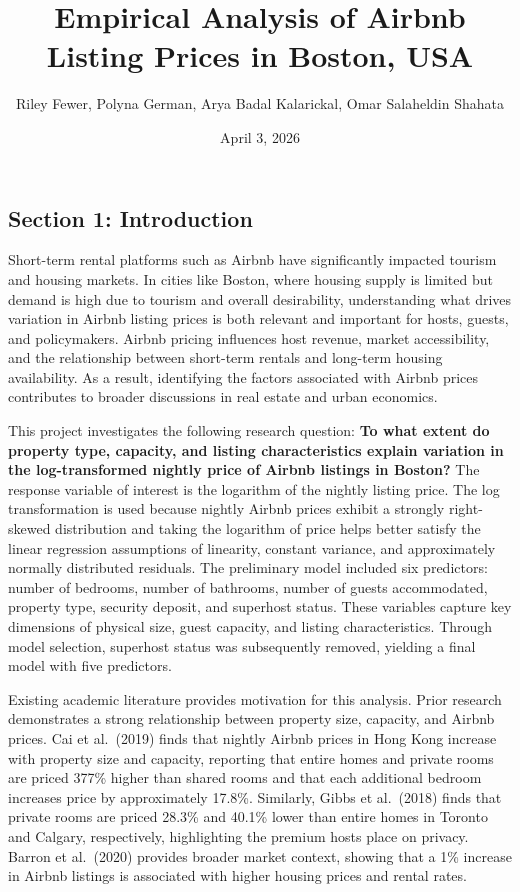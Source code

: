 \documentclass[
]{article}
\title{Empirical Analysis of Airbnb Listing Prices in Boston, USA}
\author{Riley Fewer, Polyna German, Arya Badal Kalarickal, Omar
Salaheldin Shahata}
\date{April 3, 2026}
\begin{document}
\maketitle

\subsection{Section 1: Introduction}\label{section-1-introduction}

Short-term rental platforms such as Airbnb have significantly impacted
tourism and housing markets. In cities like Boston, where housing supply
is limited but demand is high due to tourism and overall desirability,
understanding what drives variation in Airbnb listing prices is both
relevant and important for hosts, guests, and policymakers. Airbnb
pricing influences host revenue, market accessibility, and the
relationship between short-term rentals and long-term housing
availability. As a result, identifying the factors associated with
Airbnb prices contributes to broader discussions in real estate and
urban economics.

This project investigates the following research question: \textbf{To
what extent do property type, capacity, and listing characteristics
explain variation in the log-transformed nightly price of Airbnb
listings in Boston?} The response variable of interest is the logarithm
of the nightly listing price. The log transformation is used because
nightly Airbnb prices exhibit a strongly right-skewed distribution and
taking the logarithm of price helps better satisfy the linear regression
assumptions of linearity, constant variance, and approximately normally
distributed residuals. The preliminary model included six predictors:
number of bedrooms, number of bathrooms, number of guests accommodated,
property type, security deposit, and superhost status. These variables
capture key dimensions of physical size, guest capacity, and listing
characteristics. Through model selection, superhost status was
subsequently removed, yielding a final model with five predictors.

Existing academic literature provides motivation for this analysis.
Prior research demonstrates a strong relationship between property size,
capacity, and Airbnb prices. Cai et al.~(2019) finds that nightly Airbnb
prices in Hong Kong increase with property size and capacity, reporting
that entire homes and private rooms are priced 377\% higher than shared
rooms and that each additional bedroom increases price by approximately
17.8\%. Similarly, Gibbs et al.~(2018) finds that private rooms are
priced 28.3\% and 40.1\% lower than entire homes in Toronto and Calgary,
respectively, highlighting the premium hosts place on privacy. Barron et
al.~(2020) provides broader market context, showing that a 1\% increase
in Airbnb listings is associated with higher housing prices and rental
rates.
\end{document}
